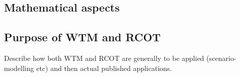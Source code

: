 \subsection{Mathematical aspects}
\label{math}

\subsection{Purpose of WTM and RCOT}
\label{purpose}

Describe how both WTM and RCOT are generally to be applied (scenario-modelling etc) and then actual published applications.